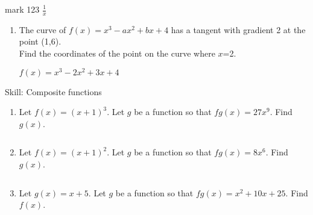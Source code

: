 

\begin{envDashBox} mark 123
     $\frac{1}{x}  $
\end{envDashBox}
\clearpage

\begin{enumerate}[leftmargin=0cm] 

\item The curve of $f(x)=x^3-ax^2+bx+4 $ has a tangent with gradient 2 at the point (1,6).\\Find the coordinates of the point on the curve where $x$=2.
    \begin{envAnswer}[blankline=8]         $   f(x)=x^3-2x^2+3x+4            $ \end{envAnswer}


\end{enumerate}



\clearpage



\begin{bxTip}{Skill: Composite functions}
\begin{enumerate}[leftmargin=0cm] 

\item Let $f(x)=(x+1)^3$. Let $g$ be a function so that $fg(x)=27x^9$. Find $g(x)$.
    \begin{envAnswer}[blankline=3]         $               $ \end{envAnswer}


\item Let $f(x)=(x+1)^2$. Let $g$ be a function so that $fg(x)=8x^6$. Find $g(x)$.
    \begin{envAnswer}[blankline=3]         $               $ \end{envAnswer}

\item Let $g(x)=x+5$. Let $g$ be a function so that $fg(x)=x^2+10x+25$. Find $f(x)$.
    \begin{envAnswer}[blankline=3]         $               $ \end{envAnswer}


\end{enumerate}

\end{bxTip}



